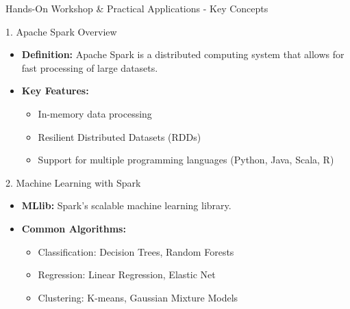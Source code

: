 \documentclass[aspectratio=169]{beamer}
\begin{document}
\begin{frame}[fragile]{Hands-On Workshop \& Practical Applications - Key Concepts}
    \begin{block}{1. Apache Spark Overview}
        \begin{itemize}
            \item \textbf{Definition:} Apache Spark is a distributed computing system that allows for fast processing of large datasets.
            \item \textbf{Key Features:}
                \begin{itemize}
                    \item In-memory data processing
                    \item Resilient Distributed Datasets (RDDs)
                    \item Support for multiple programming languages (Python, Java, Scala, R)
                \end{itemize}
        \end{itemize}
    \end{block}
    
    \begin{block}{2. Machine Learning with Spark}
        \begin{itemize}
            \item \textbf{MLlib:} Spark’s scalable machine learning library.
            \item \textbf{Common Algorithms:}
                \begin{itemize}
                    \item Classification: Decision Trees, Random Forests
                    \item Regression: Linear Regression, Elastic Net
                    \item Clustering: K-means, Gaussian Mixture Models
                \end{itemize}
        \end{itemize}
    \end{block}
\end{frame}
\end{document}
